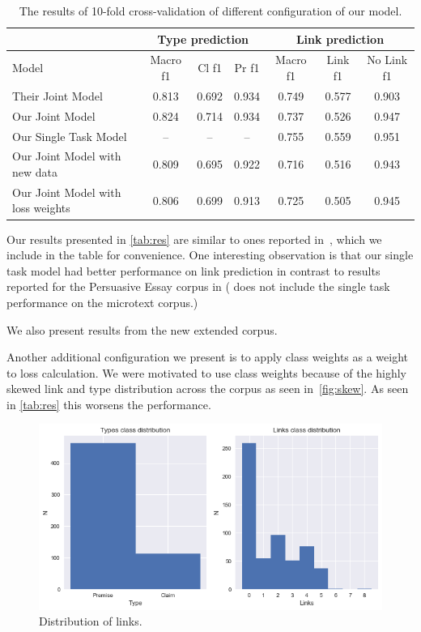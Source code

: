 \documentclass[onecolumn]{article}
\begin{document}
\begin{table}[h]
    \centering
    \begin{tabular}{| l || c | c | c | c | c | c |}
        \hline
        & \multicolumn{3}{|c|}{Type prediction} & \multicolumn{3}{|c|}{Link prediction} \\ 
        \hline
        Model & Macro f1 & Cl f1 & Pr f1 & Macro f1 & Link f1 & No Link f1 \\
        \hline
        Their Joint Model                 & 0.813 & 0.692 & 0.934 & 0.749 & 0.577 & 0.903 \\
        Our Joint Model                   & 0.824 & 0.714 & 0.934 & 0.737 & 0.526 & 0.947 \\
        Our Single Task Model             &   –   &   –   &   –   & 0.755 & 0.559 & 0.951 \\
        Our Joint Model with new data     & 0.809 & 0.695 & 0.922 & 0.716 & 0.516 & 0.943 \\
        Our Joint Model with loss weights & 0.806 & 0.699 & 0.913 & 0.725 & 0.505 & 0.945 \\
        \hline
    \end{tabular}
    \caption{The results of 10-fold cross-validation of different configuration of our model.}\label{tab:res}
\end{table}

Our results presented in \autoref{tab:res} are similar to ones reported in~\cite{potash2017here}, which we include in the table for convenience.
One interesting observation is that our single task model had better performance on link prediction in contrast to results reported for the Persuasive Essay corpus in \cite{potash2017here}
(\cite{potash2017here} does not include the single task performance on the microtext corpus.)

We also present results from the new extended corpus.

Another additional configuration we present is to apply class weights as a weight to loss calculation.
We were motivated to use class weights because of the highly skewed link and type distribution across the corpus as seen in~\autoref{fig:skew}.
As seen in \autoref{tab:res} this worsens the performance.

\begin{figure}[h]
    \centering
    \includegraphics[width=0.6\linewidth]{fig/dist.png}
    \caption{Distribution of links.}\label{fig:skew}
\end{figure}
\end{document}
